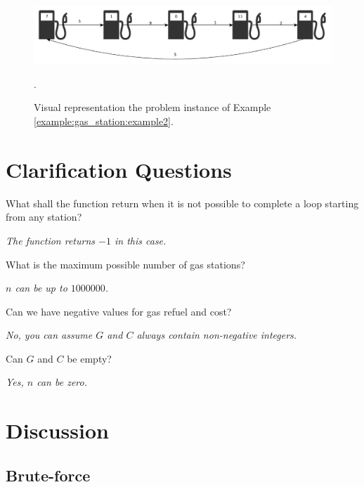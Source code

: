\begin{figure}
	\centering
	\includegraphics[width=\textwidth]{sources/gas_station/images/example2}
	\caption[Implicit graph for the Example \ref{example:gas_station:example2}.]
	{Visual representation the problem instance of Example
	\ref{example:gas_station:example2}.}.
	\label{fig:gas_station:example2}
\end{figure}

\section{Clarification Questions}

\begin{QandA}
	\item What shall the function return when it is not possible to complete a loop starting from any station? 
	\begin{answered}
		\textit{The function returns $-1$ in this case.}
	\end{answered}

	\item What is the maximum possible number of gas stations?
	\begin{answered}
		\textit{$n$ can be up to $1000000$.}
	\end{answered}

	\item Can we have negative values for gas refuel and cost?
	\begin{answered}
		\textit{No, you can assume $G$ and $C$ always contain non-negative integers.}
	\end{answered}
	
	\item Can $G$ and $C$ be empty?
	\begin{answered}
		\textit{Yes, $n$ can be zero.}
	\end{answered}
\end{QandA}

\section{Discussion}
\label{gas_station:sec:discussion}


\subsection{Brute-force}
\label{gas_station:sec:bruteforce}

